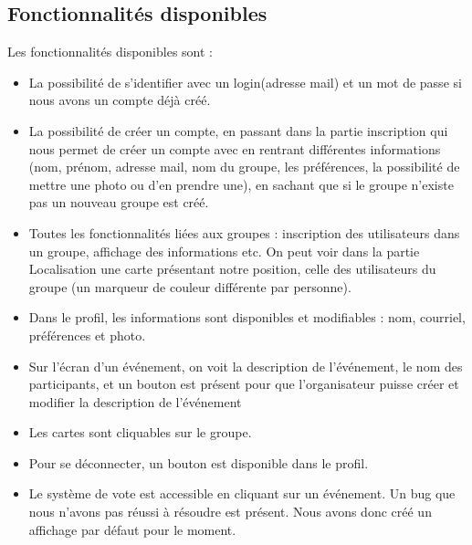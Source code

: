 \subsection{Fonctionnalités disponibles}
Les fonctionnalités disponibles sont : 
\begin{itemize}
\item La possibilité de s'identifier avec un login(adresse mail) et un mot de passe si nous avons un compte déjà créé.
\item La possibilité de créer un compte, en passant dans la partie inscription qui nous permet de créer un compte avec en rentrant différentes informations (nom, prénom, adresse mail, nom du groupe, les préférences, la possibilité de mettre une photo ou d'en prendre une), en sachant que si le groupe n'existe pas un nouveau groupe est créé.
\item Toutes les fonctionnalités liées aux groupes : inscription des utilisateurs dans un groupe, affichage des informations etc. On peut voir dans la partie Localisation une carte présentant notre position, celle des utilisateurs du groupe (un marqueur de couleur différente par personne).
\item Dans le profil, les informations sont disponibles et modifiables : nom, courriel, préférences et photo.
\item Sur l'écran d'un événement, on voit la description de l'événement, le nom des participants, et un bouton est présent pour que l'organisateur puisse créer et modifier la description de l'événement
\item Les cartes sont cliquables sur le groupe.
\item Pour se déconnecter, un bouton est disponible dans le profil.
\item Le système de vote est accessible en cliquant sur un événement. Un bug que nous n'avons pas réussi à résoudre est présent. Nous avons donc créé un affichage par défaut pour le moment.
\end{itemize}